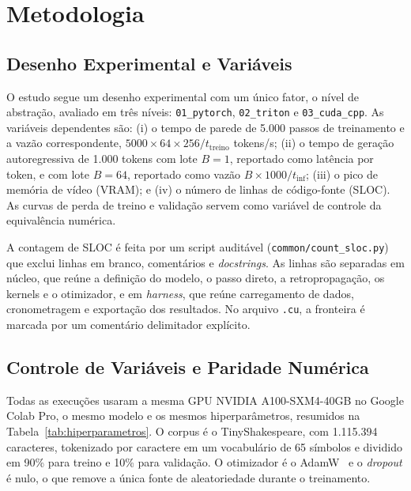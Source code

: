 \documentclass[conference]{IEEEtran}
\begin{document}
\section{Metodologia}
\label{sec:metodologia}

\subsection{Desenho Experimental e Variáveis}

O estudo segue um desenho experimental com um único fator, o nível de abstração, avaliado em três níveis: \texttt{01\_pytorch}, \texttt{02\_triton} e \texttt{03\_cuda\_cpp}. As variáveis dependentes são: (i) o tempo de parede de 5.000 passos de treinamento e a vazão correspondente, $5000 \times 64 \times 256 / t_{\mathrm{treino}}$ tokens/s; (ii) o tempo de geração autoregressiva de 1.000 tokens com lote $B=1$, reportado como latência por token, e com lote $B=64$, reportado como vazão $B \times 1000 / t_{\mathrm{inf}}$; (iii) o pico de memória de vídeo (VRAM); e (iv) o número de linhas de código-fonte (SLOC). As curvas de perda de treino e validação servem como variável de controle da equivalência numérica.

A contagem de SLOC é feita por um script auditável (\texttt{common/count\_sloc.py}) que exclui linhas em branco, comentários e \textit{docstrings}. As linhas são separadas em núcleo, que reúne a definição do modelo, o passo direto, a retropropagação, os kernels e o otimizador, e em \textit{harness}, que reúne carregamento de dados, cronometragem e exportação dos resultados. No arquivo \texttt{.cu}, a fronteira é marcada por um comentário delimitador explícito.

\subsection{Controle de Variáveis e Paridade Numérica}

Todas as execuções usaram a mesma GPU NVIDIA A100-SXM4-40GB no Google Colab Pro, o mesmo modelo e os mesmos hiperparâmetros, resumidos na Tabela~\ref{tab:hiperparametros}. O corpus é o TinyShakespeare, com 1.115.394 caracteres, tokenizado por caractere em um vocabulário de 65 símbolos e dividido em 90\% para treino e 10\% para validação. O otimizador é o AdamW~\cite{loshchilov2019decoupled} e o \textit{dropout} é nulo, o que remove a única fonte de aleatoriedade durante o treinamento.
\end{document}

